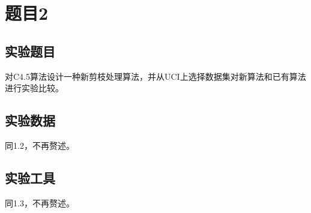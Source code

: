 \documentclass[12pt]{article}
\begin{document}
\newpage
\section{题目2}
\subsection{实验题目}
对C4.5算法设计一种新剪枝处理算法，并从UCI上选择数据集对新算法和已有算法进行实验比较。
\vbox{}
\subsection{实验数据}
同1.2，不再赘述。

\subsection{实验工具}
同1.3，不再赘述。
\vbox{}
\end{document}

